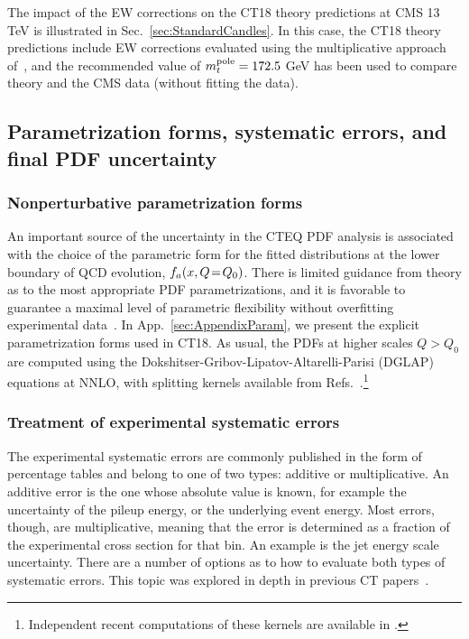 The impact of the EW corrections on the CT18 theory predictions at CMS 13 TeV is illustrated in Sec.~\ref{sec:StandardCandles}. In this case, the CT18 theory predictions include EW corrections evaluated using the multiplicative approach of~\cite{Czakon:2017wor}, and the recommended value of $m_t^{\rm pole}=172.5$ GeV has been used to compare theory and the CMS data (without fitting the data).

\subsection{Parametrization forms, systematic errors, and final PDF uncertainty} 
\label{sec:Paramstudies}

\subsubsection{Nonperturbative parametrization forms\label{sec:ParamForms}} 
An important source of the uncertainty in the CTEQ PDF analysis is associated with the choice of the parametric form for the fitted distributions at the lower boundary of QCD evolution, $f_a(x,Q\! =\! Q_0)$. There is limited guidance
from theory as to the most appropriate PDF parametrizations, and it is
favorable to guarantee a maximal level of parametric flexibility without
overfitting experimental data~\cite{Kovarik:2019xvh}. In App.~\ref{sec:AppendixParam}, we present the explicit parametrization forms used in CT18. As usual, the PDFs at higher scales $Q>Q_0$ are computed
using the Dokshitser-Gribov-Lipatov-Altarelli-Parisi (DGLAP) equations at NNLO, with splitting kernels available from Refs.~\cite{Moch:2004pa,Vogt:2004mw}.\footnote{Independent recent computations of these kernels are available in \cite{Ablinger:2014nga,Ablinger:2017tan}.}

\subsubsection{Treatment of experimental systematic errors\label{sec:SystErrors}} The experimental systematic errors are commonly published in the form of percentage tables and belong to one of two types: additive or multiplicative. An additive error is the one whose absolute value is known, for example the uncertainty of the pileup energy, or the underlying event energy. Most errors, though, are multiplicative, meaning that the error is determined as a fraction of the experimental cross section for that bin. An example is the jet energy scale uncertainty. There are a number of options as to how to evaluate both types of systematic errors. This topic was explored in depth in previous CT papers~\cite{Stump:2003yu,Nadolsky:2008zw,Lai:2010vv,Ball:2012wy,Gao:2013xoa,Dulat:2015mca,Hou:2016nqm}. 

